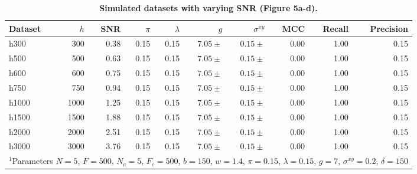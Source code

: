 \begin{table}
\caption{\label{tab:snr} \textbf{Simulated datasets with varying SNR (Figure 5a-d).}}
\begin{tabular}{lrrrrrrrrr}
\toprule
Dataset &  $h$ & SNR &  $\pi$ &  $\lambda$ &  $g$ &  $\sigma^{xy}$ &  MCC &  Recall &  Precision \\
\midrule
h300  & 300  & 0.38 & 0.15 & 0.15 & $7.05 \pm$ & $0.15 \pm$ & 0.00 & 1.00 & 0.15 \\
h500  & 500  & 0.63 & 0.15 & 0.15 & $7.05 \pm$ & $0.15 \pm$ & 0.00 & 1.00 & 0.15 \\
h600  & 600  & 0.75 & 0.15 & 0.15 & $7.05 \pm$ & $0.15 \pm$ & 0.00 & 1.00 & 0.15 \\
h750  & 750  & 0.94 & 0.15 & 0.15 & $7.05 \pm$ & $0.15 \pm$ & 0.00 & 1.00 & 0.15 \\
h1000 & 1000 & 1.25 & 0.15 & 0.15 & $7.05 \pm$ & $0.15 \pm$ & 0.00 & 1.00 & 0.15 \\
h1500 & 1500 & 1.88 & 0.15 & 0.15 & $7.05 \pm$ & $0.15 \pm$ & 0.00 & 1.00 & 0.15 \\
h2000 & 2000 & 2.51 & 0.15 & 0.15 & $7.05 \pm$ & $0.15 \pm$ & 0.00 & 1.00 & 0.15 \\
h3000 & 3000 & 3.76 & 0.15 & 0.15 & $7.05 \pm$ & $0.15 \pm$ & 0.00 & 1.00 & 0.15 \\
\bottomrule
\multicolumn{10}{l}{\footnotesize{\parbox{4in}{$^1$Parameters $N=5$, $F=500$, $N_c=5$, $F_c=500$, $b=150$, $w=1.4$, $\pi=0.15$, $\lambda=0.15$, $g=7$, $\sigma^{xy}=0.2$, $\delta=150$}}}
\end{tabular}
\end{table}

